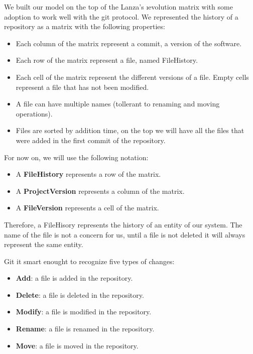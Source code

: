 We built our model on the top of the Lanza's \i{evolution matrix} \cite{Lanza2001} with some adoption to work well with the git protocol. 
We represented the history of a repository as a matrix with the following properties:
\begin{itemize}
    \item Each column of the matrix represent a commit, a version of the software.
    \item Each row of the matrix represent a file, named FileHistory.
    \item Each cell of the matrix represent the different versions of a file. Empty cells represent a file that has not been modified.
    \item A file can have multiple names (tollerant to renaming and moving operations).
    \item Files are sorted by addition time, on the top we will have all the files that were added in the first commit of the repository. 
\end{itemize}

For now on, we will use the following notation:
\begin{itemize}
    \item A \textbf{FileHistory} represents a row of the matrix.
    \item A \textbf{ProjectVersion} represents a column of the matrix.
    \item A \textbf{FileVersion} represents a cell of the matrix.
\end{itemize}

Therefore, a FileHisory represents the history of an entity of our system. 
The name of the file is not a concern for us, until a file is not deleted it will always represent the same entity. 

Git it smart enought to recognize five types of changes:
\begin{itemize}
    \item \textbf{Add}: a file is added in the repository.
    \item \textbf{Delete}: a file is deleted in the repository.
    \item \textbf{Modify}: a file is modified in the repository.
    \item \textbf{Rename}: a file is renamed in the repository.
    \item \textbf{Move}: a file is moved in the repository.
\end{itemize}


